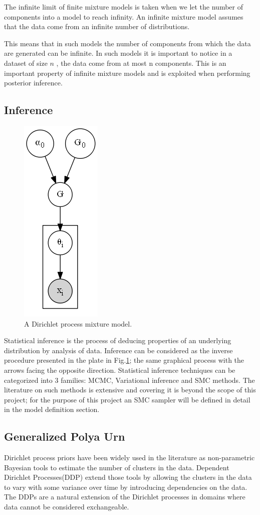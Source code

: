 \documentclass[twoside,hidelinks]{article}
\begin{document}
The infinite limit of finite mixture models is taken when we let the number of components into a model to reach infinity. An infinite mixture model assumes that the data come from an infinite number of distributions.

This means that in such models the number of components from which the data are generated can be infinite. In such models it is important to notice in a dataset of size $n$ , the data come from at most n components. This is an important property of infinite mixture models and is exploited when performing posterior inference.

\subsection{Inference}
\begin{figure}
          \centerline{\includegraphics[width=.17\textwidth]{dpmm3}}
	\caption{A Dirichlet process mixture model.}
	\label{mm}
\end{figure}


Statistical inference is the process of deducing properties of an underlying distribution by analysis of data. Inference can be considered as the inverse procedure presented in the plate in Fig.\ref{mm}; the same graphical process with the arrows facing the opposite direction. Statistical inference techniques can be categorized into 3 families: MCMC, Variational inference and SMC methods. The literature on such methods is extensive and covering it is beyond the scope of this project; for the purpose of this project an SMC sampler will be defined in detail in the model definition section. 

\subsection{Generalized Polya Urn}


Dirichlet process priors have been widely used in the literature as non-parametric Bayesian tools to estimate the number of clusters in the data\cite{antoniak}. Dependent Dirichlet Processes(DDP) extend those tools by allowing the clusters in the data to vary with some variance over time by introducing dependencies on the data. The DDPs are a natural extension of the Dirichlet processes in domains where data cannot be considered exchangeable. 
\end{document}
